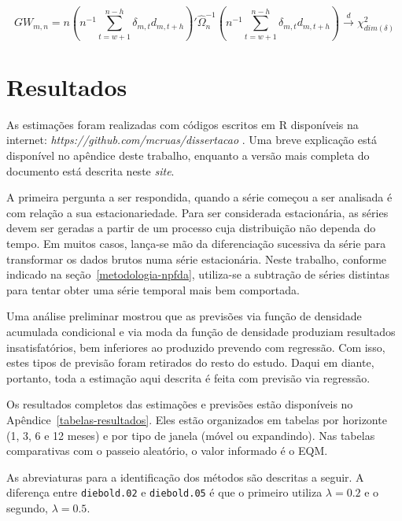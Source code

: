 \documentclass[
	12pt,				%
	openright,			%
	oneside,			%
	a4paper,			%
	english,			%
	brazil				%
	]{dissertacao-ufrgs-abntex2}
\begin{document}
\begin{description}
	
\begin{equation}
GW_{m,n} = n \left( n^{-1} \sum_{t=w+1}^{n-h} \delta_{m,t} d_{m,t+h} \right)' \hat{\Omega}_n^{-1}	
\left( n^{-1} \sum_{t=w+1}^{n-h} \delta_{m,t} d_{m,t+h} \right) \overset{d}{\longrightarrow} \chi_{dim(\delta)}^2
\end{equation}		
	
	
	
	
\end{description}


\chapter{Resultados}

As estimações foram realizadas com códigos escritos em R disponíveis na internet: \emph{https://github.com/mcruas/dissertacao} . Uma breve  explicação está 
disponível no apêndice deste trabalho, enquanto a versão mais completa do documento está descrita neste \emph{site}.

A primeira pergunta a ser respondida, quando a série começou a ser analisada é com relação a sua estacionariedade. Para ser considerada estacionária, as séries devem ser geradas a partir de um processo cuja distribuição não dependa do tempo. Em muitos casos, lança-se mão da diferenciação sucessiva da série para transformar os dados brutos numa série estacionária. Neste trabalho, conforme indicado na seção~\ref{metodologia-npfda}, utiliza-se a subtração de séries distintas para tentar obter uma série temporal mais bem comportada.

Uma análise preliminar mostrou que as previsões via função de densidade acumulada condicional e via moda da função de densidade produziam resultados insatisfatórios, bem inferiores ao produzido prevendo com regressão. Com isso, estes tipos de previsão foram retirados do resto do estudo. Daqui em diante, portanto, toda a estimação aqui descrita é feita com previsão via regressão.

Os resultados completos das estimações e previsões estão disponíveis no Apêndice~\ref{tabelas-resultados}. Eles estão organizados em tabelas por horizonte (1, 3, 6 e 12 meses) e por tipo de janela (móvel ou expandindo). Nas tabelas comparativas com o passeio aleatório, o valor informado é o EQM.

As abreviaturas para a identificação dos métodos são descritas a seguir. A diferença entre \texttt{diebold.02} e \texttt{diebold.05} é que o primeiro utiliza $\lambda=0.2$ e o segundo, $\lambda=0.5$.
\end{document}
